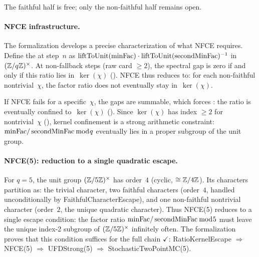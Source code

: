 \noindent The faithful half is free; only the non-faithful half
remains open.

\paragraph{NFCE infrastructure.}
The formalization develops a precise characterization of what NFCE
requires.  Define the  at step~$n$ as
$\mathrm{liftToUnit}(\mathrm{minFac}) \cdot
\mathrm{liftToUnit}(\operatorname{secondMinFac})^{-1}$
in~$(\mathbb{Z}/q\mathbb{Z})^\times$.
At non-fallback steps (raw card $\geq 2$), the spectral gap is zero
if and only if this ratio lies in~$\ker(\chi)$
().
NFCE thus reduces to: for each non-faithful nontrivial~$\chi$, the
factor ratio does not eventually stay in~$\ker(\chi)$.

If NFCE fails for a specific~$\chi$, the gaps are summable,
which forces : the ratio is eventually
confined to~$\ker(\chi)$
().
Since $\ker(\chi)$ has index $\geq 2$ for nontrivial~$\chi$
(),
kernel confinement is a strong arithmetic constraint:
$\mathrm{minFac} / \operatorname{secondMinFac} \bmod q$ eventually lies in a
proper subgroup of the unit group.

\paragraph{NFCE(5): reduction to a single quadratic escape.}
For $q = 5$, the unit group $(\mathbb{Z}/5\mathbb{Z})^\times$ has order~$4$
(cyclic, $\cong \mathbb{Z}/4\mathbb{Z}$).  Its characters partition as: the trivial
character, two faithful characters (order~$4$, handled unconditionally
by FaithfulCharacterEscape), and one non-faithful nontrivial character
(order~$2$, the unique quadratic character).  Thus NFCE(5) reduces to a
single escape condition: the factor ratio
$\mathrm{minFac} / \operatorname{secondMinFac} \bmod 5$ must leave the unique
index-2 subgroup of $(\mathbb{Z}/5\mathbb{Z})^\times$ infinitely often.
The formalization proves that this
 condition suffices for the full chain
{\color{leanink}$\checkmark$}:
RatioKernelEscape $\Rightarrow$ NFCE(5) $\Rightarrow$ UFDStrong(5)
$\Rightarrow$ StochasticTwoPointMC(5).

